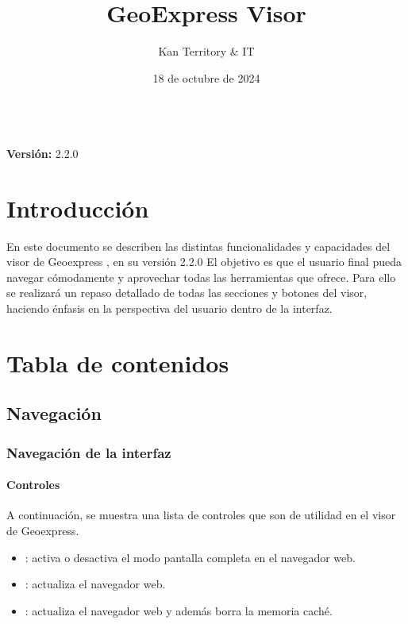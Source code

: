 \documentclass[a4paper,11pt,openany,spanish]{sphinxmanual}
\date {}
\title{GeoExpress Visor}
\date{18 de octubre de 2024}
\author{Kan Territory \& IT}
\newcommand{\therelease}{2.2.0}
\renewcommand{\sphinxmaketitle}{%
      \begingroup
        \begin{center}
          \vspace*{6cm}  %
          {\Huge \textbf{\color[RGB]{245,63,97} \thetitle}}  %
          \vspace{0.5cm}  %
          \\
          {\Large \textbf{\color[RGB]{245,63,97} Versión:} \color[RGB]{245,63,97} \therelease}  %
        \end{center}
      \endgroup
    }
\begin{document}
\pagestyle{empty}
\sphinxmaketitle
\pagestyle{plain}
\sphinxtableofcontents
\pagestyle{normal}
\label{\detokenize{index::doc}}



\chapter{Introducción}
\label{\detokenize{index:introduccion}}
\sphinxAtStartPar
En este documento se describen las distintas funcionalidades y capacidades del visor de Geoexpress , en su versión 2.2.0
El objetivo es que el usuario final pueda navegar cómodamente y aprovechar todas las herramientas que ofrece. Para ello se realizará un repaso detallado de todas las secciones y botones del visor, haciendo énfasis en la perspectiva del usuario dentro de la interfaz.

\noindent{}


\chapter{Tabla de contenidos}
\label{\detokenize{index:tabla-de-contenidos}}
\sphinxstepscope


\section{Navegación}
\label{\detokenize{navigation/index:navegacion}}\label{\detokenize{navigation/index::doc}}
\sphinxstepscope


\subsection{Navegación de la interfaz}
\label{\detokenize{navigation/interfaz:navegacion-de-la-interfaz}}\label{\detokenize{navigation/interfaz::doc}}

\subsubsection{Controles}
\label{\detokenize{navigation/interfaz:controles}}
\sphinxAtStartPar
A continuación, se muestra una lista de controles que son de utilidad en el visor de Geoexpress.
\begin{itemize}
\item {} 
\sphinxAtStartPar
{}: activa o desactiva el modo pantalla completa en el navegador web.

\item {} 
\sphinxAtStartPar
{}: actualiza el navegador web.

\item {} 
\sphinxAtStartPar
{}: actualiza el navegador web y además borra la memoria caché.

\end{itemize}
\end{document}
